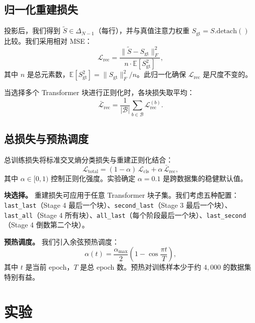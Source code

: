 \documentclass[preprint,12pt]{elsarticle}
\begin{document}
\subsection{归一化重建损失}

投影后，我们得到 $\tilde{S} \in \Delta_{N-1}$（每行），并与真值注意力权重 $S_{\mathrm{gt}} = S.\mathrm{detach}()$ 比较。我们采用相对 MSE：
\begin{equation}
\mathcal{L}_{\mathrm{rec}} = \frac{\|\tilde{S} - S_{\mathrm{gt}}\|_F^2}{n \cdot \mathbb{E}[S_{\mathrm{gt}}^2]},
\end{equation}
其中 $n$ 是总元素数，$\mathbb{E}[S_{\mathrm{gt}}^2] = \|S_{\mathrm{gt}}\|_F^2 / n$。此归一化确保 $\mathcal{L}_{\mathrm{rec}}$ 是尺度不变的。

当选择多个 Transformer 块进行正则化时，各块损失取平均：
\begin{equation}
\bar{\mathcal{L}}_{\mathrm{rec}} = \frac{1}{|\mathcal{B}|} \sum_{b \in \mathcal{B}} \mathcal{L}_{\mathrm{rec}}^{(b)}.
\end{equation}

\subsection{总损失与预热调度}

总训练损失将标准交叉熵分类损失与重建正则化结合：
\begin{equation}
\mathcal{L}_{\mathrm{total}} = (1 - \alpha)\,\mathcal{L}_{\mathrm{cls}} + \alpha\,\bar{\mathcal{L}}_{\mathrm{rec}},
\end{equation}
其中 $\alpha \in [0, 1)$ 控制正则化强度。实验确定 $\alpha = 0.1$ 是跨数据集的稳健默认值。

\textbf{块选择。} 重建损失可应用于任意 Transformer 块子集。我们考虑五种配置：\texttt{last\_last}（Stage 4 最后一个块）、\texttt{second\_last}（Stage 3 最后一个块）、\texttt{last\_all}（Stage 4 所有块）、\texttt{all\_last}（每个阶段最后一个块）、\texttt{last\_second}（Stage 4 倒数第二个块）。

\textbf{预热调度。} 我们引入余弦预热调度：
\begin{equation}
\alpha(t) = \frac{\alpha_{\max}}{2}\left(1 - \cos\frac{\pi t}{T}\right),
\end{equation}
其中 $t$ 是当前 epoch，$T$ 是总 epoch 数。预热对训练样本少于约 $4{,}000$ 的数据集特别有益。

\section{实验}
\end{document}
